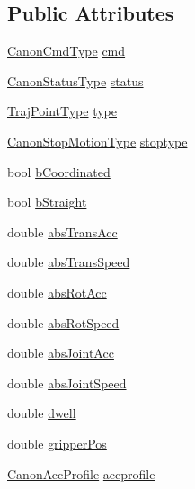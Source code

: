 \subsection*{Public Attributes}
\begin{DoxyCompactItemize}
\item 
\hyperlink{namespaceRCS_a55bbd74afb87a330de1b95af65f4cb75}{Canon\-Cmd\-Type} \hyperlink{structRCS_1_1CanonCmd_abf4d78b8604ce73d23d58f1fdcd7305e}{cmd}
\item 
\hyperlink{namespaceRCS_a0e720341c250145b8a2bbf6a1afa777d}{Canon\-Status\-Type} \hyperlink{structRCS_1_1CanonCmd_a8ad6bd631d2cf99c00ec267791680236}{status}
\item 
\hyperlink{namespaceRCS_ae705dbb4b887b18fef40316b6d5ca2c9}{Traj\-Point\-Type} \hyperlink{structRCS_1_1CanonCmd_abf1d51c90a3f1b4c5796292c53cbde01}{type}
\item 
\hyperlink{namespaceRCS_a39ae96212f304024b5f91fe8d63a40c0}{Canon\-Stop\-Motion\-Type} \hyperlink{structRCS_1_1CanonCmd_a22bc418b884c7afabf0a2d3538f74cad}{stoptype}
\item 
bool \hyperlink{structRCS_1_1CanonCmd_abae89c19f08f9011d6e5d3f86e8b6df9}{b\-Coordinated}
\item 
bool \hyperlink{structRCS_1_1CanonCmd_aee8ba85725943aa0102f3305a1bce2a7}{b\-Straight}
\item 
double \hyperlink{structRCS_1_1CanonCmd_a129e91d931073194c3baaed83f56373e}{abs\-Trans\-Acc}
\item 
double \hyperlink{structRCS_1_1CanonCmd_abac67431174c72bbc8bc1e14916cba60}{abs\-Trans\-Speed}
\item 
double \hyperlink{structRCS_1_1CanonCmd_ae1abe3a2d6c4c54776ad46738b3bf571}{abs\-Rot\-Acc}
\item 
double \hyperlink{structRCS_1_1CanonCmd_ad7ce99c4f8d61314aef30c376ace79b7}{abs\-Rot\-Speed}
\item 
double \hyperlink{structRCS_1_1CanonCmd_ac31a9f71e4cbf531255df37780deed05}{abs\-Joint\-Acc}
\item 
double \hyperlink{structRCS_1_1CanonCmd_a0af201b279565849516543a913f443f7}{abs\-Joint\-Speed}
\item 
double \hyperlink{structRCS_1_1CanonCmd_a842c88485db006b71c7653e2a2159233}{dwell}
\item 
double \hyperlink{structRCS_1_1CanonCmd_a03e23d97c74abd3c6b5b38aec8ae5fc2}{gripper\-Pos}
\item 
\hyperlink{namespaceRCS_a452a9217023e577031dcdf7e533b2ead}{Canon\-Acc\-Profile} \hyperlink{structRCS_1_1CanonCmd_a29d47510cc8f459cfa085ef9123bef22}{accprofile}

\end{DoxyCompactItemize}
